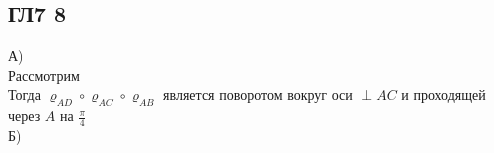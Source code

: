 		\subsection{ГЛ7 8}
		А)\\
		Рассмотрим \\
		Тогда $\varrho_{A D} \circ \varrho_{A C} \circ \varrho_{A B}$ является поворотом вокруг оси $\perp AC$ и проходящей через $A$ на $\frac{\pi}{4}$
		\\
		Б)\\
		\\
		